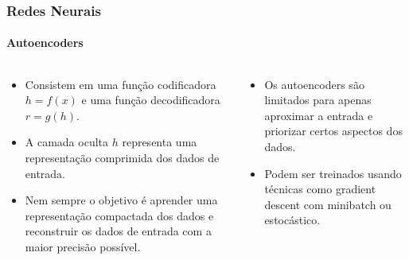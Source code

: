 \documentclass{beamer}
\begin{document}
	\begin{frame}
		\frametitle{Redes Neurais}
		\framesubtitle{Autoencoders}
		\begin{columns}[t]
			\begin{column}{0.5\textwidth}
				\begin{itemize}
					\item Consistem em uma função codificadora $h = f(x)$ e uma função decodificadora $r = g(h)$.
					\item A camada oculta $h$ representa uma representação comprimida dos dados de entrada.
					\item Nem sempre o objetivo é aprender uma representação compactada dos dados e reconstruir os dados de entrada com a maior precisão possível.
				\end{itemize}
			\end{column}
			\begin{column}{0.5\textwidth}
				\begin{itemize}
					\item Os autoencoders são limitados para apenas aproximar a entrada e priorizar certos aspectos dos dados.
					\item Podem ser treinados usando técnicas como gradient descent com minibatch ou estocástico.
				\end{itemize}
				\begin{figure}[h]
					\centering
       				\resizebox{\textwidth}{!}{}
					\label{fig:autoencoder}
				\end{figure}
			\end{column}
		\end{columns}
	\end{frame}
	
\end{document}
